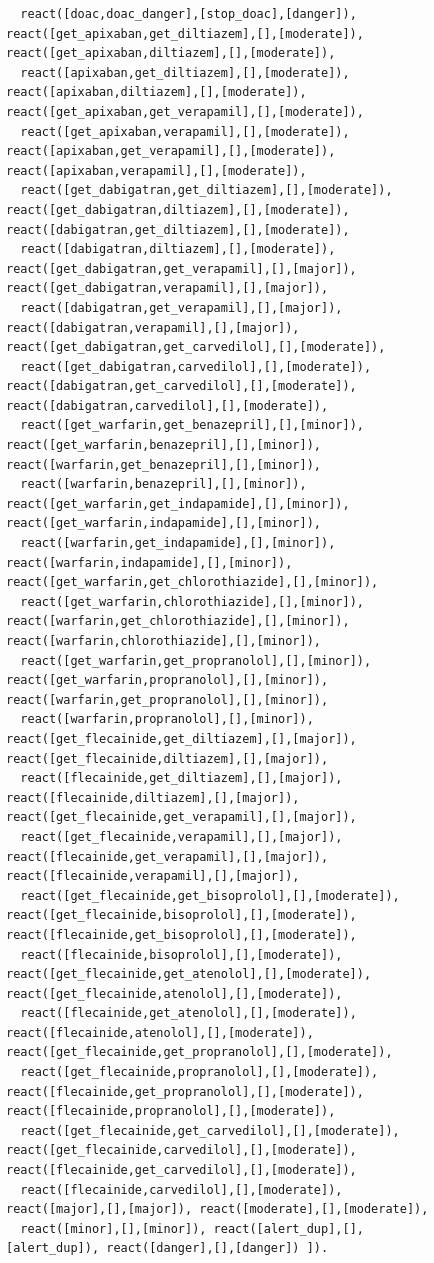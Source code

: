 \begin{figure}[t]
\begin{verbatim}
  react([doac,doac_danger],[stop_doac],[danger]), react([get_apixaban,get_diltiazem],[],[moderate]), react([get_apixaban,diltiazem],[],[moderate]),
  react([apixaban,get_diltiazem],[],[moderate]), react([apixaban,diltiazem],[],[moderate]), react([get_apixaban,get_verapamil],[],[moderate]),
  react([get_apixaban,verapamil],[],[moderate]), react([apixaban,get_verapamil],[],[moderate]), react([apixaban,verapamil],[],[moderate]),
  react([get_dabigatran,get_diltiazem],[],[moderate]), react([get_dabigatran,diltiazem],[],[moderate]), react([dabigatran,get_diltiazem],[],[moderate]),
  react([dabigatran,diltiazem],[],[moderate]), react([get_dabigatran,get_verapamil],[],[major]), react([get_dabigatran,verapamil],[],[major]),
  react([dabigatran,get_verapamil],[],[major]), react([dabigatran,verapamil],[],[major]), react([get_dabigatran,get_carvedilol],[],[moderate]),
  react([get_dabigatran,carvedilol],[],[moderate]), react([dabigatran,get_carvedilol],[],[moderate]), react([dabigatran,carvedilol],[],[moderate]), 
  react([get_warfarin,get_benazepril],[],[minor]), react([get_warfarin,benazepril],[],[minor]), react([warfarin,get_benazepril],[],[minor]),
  react([warfarin,benazepril],[],[minor]), react([get_warfarin,get_indapamide],[],[minor]), react([get_warfarin,indapamide],[],[minor]),
  react([warfarin,get_indapamide],[],[minor]), react([warfarin,indapamide],[],[minor]), react([get_warfarin,get_chlorothiazide],[],[minor]),
  react([get_warfarin,chlorothiazide],[],[minor]), react([warfarin,get_chlorothiazide],[],[minor]), react([warfarin,chlorothiazide],[],[minor]),
  react([get_warfarin,get_propranolol],[],[minor]), react([get_warfarin,propranolol],[],[minor]), react([warfarin,get_propranolol],[],[minor]),
  react([warfarin,propranolol],[],[minor]), react([get_flecainide,get_diltiazem],[],[major]), react([get_flecainide,diltiazem],[],[major]),
  react([flecainide,get_diltiazem],[],[major]), react([flecainide,diltiazem],[],[major]), react([get_flecainide,get_verapamil],[],[major]),
  react([get_flecainide,verapamil],[],[major]), react([flecainide,get_verapamil],[],[major]), react([flecainide,verapamil],[],[major]), 
  react([get_flecainide,get_bisoprolol],[],[moderate]), react([get_flecainide,bisoprolol],[],[moderate]), react([flecainide,get_bisoprolol],[],[moderate]),
  react([flecainide,bisoprolol],[],[moderate]), react([get_flecainide,get_atenolol],[],[moderate]), react([get_flecainide,atenolol],[],[moderate]), 
  react([flecainide,get_atenolol],[],[moderate]), react([flecainide,atenolol],[],[moderate]), react([get_flecainide,get_propranolol],[],[moderate]),
  react([get_flecainide,propranolol],[],[moderate]), react([flecainide,get_propranolol],[],[moderate]), react([flecainide,propranolol],[],[moderate]), 
  react([get_flecainide,get_carvedilol],[],[moderate]), react([get_flecainide,carvedilol],[],[moderate]), react([flecainide,get_carvedilol],[],[moderate]),
  react([flecainide,carvedilol],[],[moderate]), react([major],[],[major]), react([moderate],[],[moderate]),
  react([minor],[],[minor]), react([alert_dup],[],[alert_dup]), react([danger],[],[danger]) ]).


\end{verbatim}
\end{figure}
